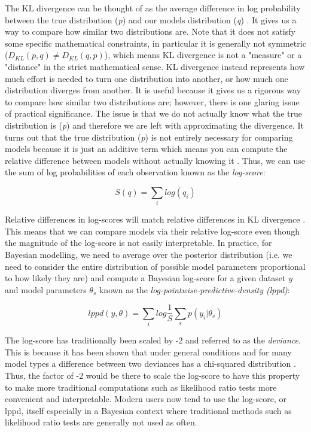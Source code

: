 The KL divergence can be thought of as the average difference in log probability between the true distribution (\textit{p}) and our models distribution (\textit{q}) \cite{McElreath2020}. It gives us a way to compare how similar two distributions are. Note that it does not satisfy some specific mathematical constraints, in particular it is generally not symmetric ($D_{KL}(p,q) \neq D_{KL}(q,p)$), which means KL divergence is not a "measure" or a "distance" in the strict mathematical sense. KL divergence instead represents how much effort is needed to turn one distribution into another, or how much one distribution diverges from another. It is useful because it gives us a rigorous way to compare how similar two distributions are; however, there is one glaring issue of practical significance. The issue is that we do not actually know what the true distribution is (\textit{p}) and therefore we are left with approximating the divergence. It turns out that the true distribution (\textit{p}) is not entirely necessary for comparing models because it is just an additive term which means you can compute the relative difference between models without actually knowing it \cite{McElreath2020}. Thus, we can use the sum of log probabilities of each observation known as the \textit{log-score}:

\begin{equation}
S(q) = \sum_i log(q_i)
\end{equation}

Relative differences in log-scores will match relative differences in KL divergence \cite{McElreath2020}. This means that we can compare models via their relative log-score even though the magnitude of the log-score is not easily interpretable. In practice, for Bayesian modelling, we need to average over the posterior distribution (i.e. we need to consider the entire distribution of possible model parameters proportional to how likely they are) and compute a Bayesian log-score for a given dataset $y$ and model parameters $\theta_s$ known as the \textit{log-pointwise-predictive-density (lppd)}:

\begin{equation} \label{eq:lppd}
lppd(y, \theta) = \sum_i log \frac{1}{S} \sum_s p(y_i | \theta_s)
\end{equation}

The log-score has traditionally been scaled by -2 and referred to as the \textit{deviance}. This is because it has been shown that under general conditions and for many model types a difference between two deviances has a chi-squared distribution \cite{Dunn2018}. Thus, the factor of -2 would be there to scale the log-score to have this property to make more traditional computations such as likelihood ratio tests more convenient and interpretable. Modern users now tend to use the log-score, or lppd, itself especially in a Bayesian context where traditional methods such as likelihood ratio tests are generally not used as often.

